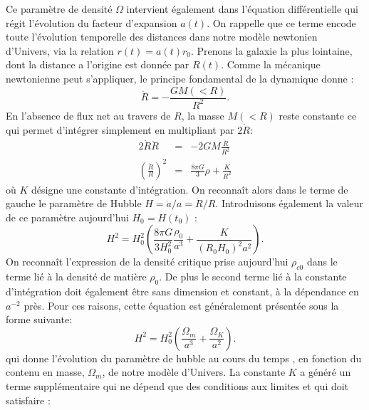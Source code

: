 Ce paramètre de densité $\Omega$ intervient également dans l'équation différentielle qui régit l'évolution du facteur d'expansion $a(t)$. On rappelle que ce terme encode toute l'évolution temporelle des distances dans notre modèle newtonien d'Univers, via la relation $r(t)=a(t)r_0$. Prenons la galaxie la plus lointaine, dont la distance a l'origine est donnée par $R(t)$. Comme la mécanique newtonienne peut s'appliquer, le principe fondamental de la dynamique donne :
\begin{equation}
\ddot R=-\frac{GM(<R)}{R^2}.
\end{equation} 
En l'absence de flux net au travers de $R$, la masse $M(<R)$ reste constante ce qui permet d'intégrer simplement en multipliant par $2\dot R$:
\begin{eqnarray}
2\dot R \ddot R &=& -2GM\frac{\dot R}{R^2}\\
\left(\frac{\dot R}{R}\right)^2&=&\frac{8\pi G}{3}\rho +\frac{K}{R^2}
\end{eqnarray}
où $K$ désigne une constante d'intégration. On reconnaît alors dans le terme de gauche le paramètre de Hubble $H=\dot a/a=\dot R/R$. Introduisons également la valeur de ce paramètre aujourd'hui $H_0=H(t_0)$ :
\begin{equation}
H^2=H_0^2(\frac{8\pi G}{3H_0^2}\frac{\rho_0}{a^3}+\frac{K}{(R_0  H_0)^2 a^2}).
\end{equation}
On reconnaît l'expression de la densité critique prise aujourd'hui $\rho_{c0}$ dans le terme lié à la densité de matière $\rho_0$. De plus le second terme lié à la constante d'intégration doit également être sans dimension et constant, à la dépendance en $a^{-2}$ près. Pour ces raisons, cette équation est généralement présentée sous la forme suivante:
\begin{equation}
H^2=H_0^2(\frac{\Omega_m}{a^3}+\frac{\Omega_K}{a^2}).
\label{e:friednewt}
\end{equation}
qui donne l'évolution du paramètre de hubble au cours du temps , en fonction du contenu en masse, $\Omega_m$, de notre modèle d'Univers. La constante $K$ a généré un terme supplémentaire qui ne dépend que des conditions aux limites et qui doit satisfaire :
